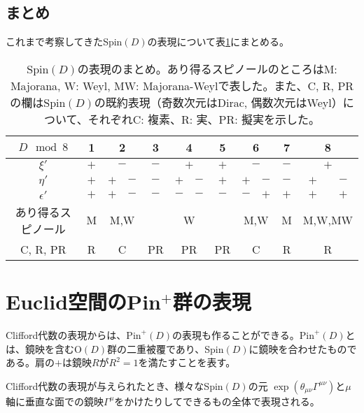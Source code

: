 \documentclass[12pt,a4paper,dvipdfmx]{jlreq}
\newcommand{\Pin}{\mathrm{Pin}^{+}}
\begin{document}
\subsection{まとめ}
これまで考察してきたSpin$(D)$の表現について表\ref{SpinDrep}にまとめる。
\begin{table}[htb]
  \begin{center}
    \begin{tabular}{|c|c|c|c|c|c|c|c|c|c|c|c|c|}\hline
      $D \mod 8$ & 1 & \multicolumn{2}{|c|}{2} & 3 & \multicolumn{2}{|c|}{4} & 5 & \multicolumn{2}{|c|}{6} & 7 & \multicolumn{2}{|c|}{8} \\ \hline
      $\xi'$ & $+$ & \multicolumn{2}{|c|}{$-$} & $-$ & \multicolumn{2}{|c|}{$+$} & $+$ & \multicolumn{2}{|c|}{$-$} & $-$ & \multicolumn{2}{|c|}{$+$} \\\hline
      $\eta'$ & $+$ & $+$ & $-$ &  $-$ & $+$ & $-$ & $+$ & $+$ & $-$ & $-$ & $+$ & $-$ \\ \hline
      $\epsilon'$ & $+$ & $+$ & $-$ & $-$ & $-$ & $-$ & $-$ & $-$ & $+$ & $+$ & $+$ & $+$ \\ \hline
      あり得るスピノール & M & \multicolumn{2}{|c|}{M,W} &  & \multicolumn{2}{|c|}{W} &  & \multicolumn{2}{|c|}{M,W} & M & \multicolumn{2}{|c|}{M,W,MW} \\ \hline
      C, R, PR & R & \multicolumn{2}{|c|}{C} & PR & \multicolumn{2}{|c|}{PR} & PR & \multicolumn{2}{|c|}{C} & R & \multicolumn{2}{|c|}{R} \\ \hline
    \end{tabular}
  \end{center} 
  \caption{Spin$(D)$の表現のまとめ。あり得るスピノールのところはM: Majorana, W: Weyl, MW: Majorana-Weylで表した。また、C, R, PRの欄はSpin$(D)$の既約表現（奇数次元はDirac, 偶数次元はWeyl）について、それぞれC: 複素、R: 実、PR: 擬実を示した。}
  \label{SpinDrep}
\end{table}

\section{Euclid空間のPin\texorpdfstring{${}^{+}$}{+}群の表現}
Clifford代数の表現からは、$\Pin(D)$の表現も作ることができる。$\Pin(D)$とは、鏡映を含むO$(D)$群の二重被覆であり、Spin$(D)$に鏡映を合わせたものである。肩の$+$は鏡映$R$が$R^2=1$を満たすことを表す。

Clifford代数の表現が与えられたとき、様々なSpin$(D)$の元
$\exp(\theta_{\mu\nu}\Gamma^{\mu\nu})$と$\mu$軸に垂直な面での鏡映$\Gamma^{\mu}$をかけたりしてできるもの全体で表現される。
\end{document}
